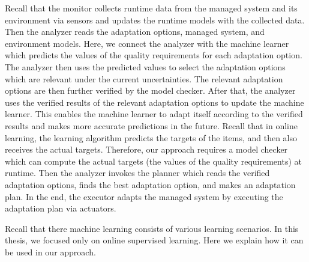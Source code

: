 \documentclass[a4paper,12pt]{article}
\begin{document}
Recall that the monitor collects runtime data from the managed system and its environment via sensors and updates the runtime models with the collected data. Then the analyzer reads the adaptation options, managed system, and environment models. Here, we connect the analyzer with the machine learner which predicts the values of the quality requirements for each adaptation option. The analyzer then uses the predicted values to select the adaptation options which are relevant under the current uncertainties. The relevant adaptation options are then further verified by the model checker. After that, the analyzer uses the verified results of the relevant adaptation options to update the machine learner. This enables the machine learner to adapt itself according to the verified results and makes more accurate predictions in the future. Recall that in online learning, the learning algorithm predicts the targets of the items, and then also receives the actual targets. Therefore, our approach requires a model checker which can compute the actual targets (the values of the quality requirements) at runtime. Then the analyzer invokes the planner which reads the verified adaptation options, finds the best adaptation option, and makes an adaptation plan. In the end, the executor adapts the managed system by executing the adaptation plan via actuators.

Recall that there machine learning consists of various learning scenarios. In this thesis, we focused only on online supervised learning. Here we explain how it can be used in our approach.
\end{document}
